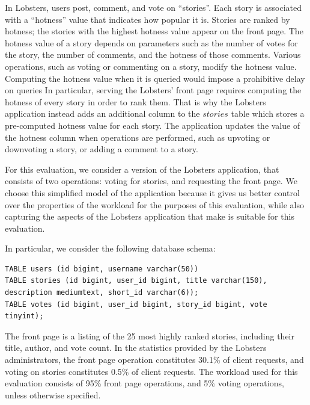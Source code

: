 \bigskip
\noindent
In Lobsters, users post, comment, and vote on ``stories''.
Each story is associated with a ``hotness'' value that indicates how popular it is.
Stories are ranked by hotness;
the stories with the highest hotness value appear on the front page.
The hotness value of a story depends on parameters such as the number of votes for the story,
the number of comments, and the hotness of those comments.
Various operations, such as voting or commenting on a story, modify the hotness value.
Computing the hotness value when it is queried would impose a prohibitive delay on queries
In particular, serving the Lobsters' front page requires computing the hotness of every story in order to rank them.
That is why the Lobsters application instead adds an additional column to the $stories$ table which stores a pre-computed
hotness value for each story.
The application updates the value of the hotness column when operations are performed,
such as upvoting or downvoting a story, or adding a comment to a story.

For this evaluation, we consider a version of the Lobsters application, that consists of two operations:
voting for stories, and requesting the front page.
We choose this simplified model of the application because it gives us better control over the properties of the workload
for the purposes of this evaluation,
while also capturing the aspects of the Lobsters application that make is suitable for this evaluation.

In particular, we consider the following database schema:

\begin{lstlisting}[caption={Simplified Lobsters schema used in this evaluation.}]
TABLE users (id bigint, username varchar(50))
TABLE stories (id bigint, user_id bigint, title varchar(150), description mediumtext, short_id varchar(6));
TABLE votes (id bigint, user_id bigint, story_id bigint, vote tinyint);
\end{lstlisting}

The front page is a listing of the 25 most highly ranked stories, including their title, author, and vote count.
In the statistics provided by the Lobsters administrators, the front page operation constitutes 30.1\% of client requests,
and voting on stories constitutes 0.5\% of client requests.
The workload used for this evaluation consists of 95\% front page operations, and 5\% voting operations, unless otherwise specified.

